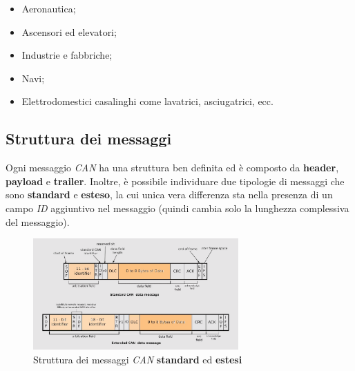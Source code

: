 \begin{itemize}
    \item Aeronautica;
    \item Ascensori ed elevatori;
    \item Industrie e fabbriche;
    \item Navi;
    \item Elettrodomestici casalinghi come lavatrici, asciugatrici, ecc. \cite{can_bus_dewesoft}
\end{itemize}

\subsection{Struttura dei messaggi}
Ogni messaggio \emph{CAN} ha una struttura ben definita ed è composto da \textbf{header}, \textbf{payload} e \textbf{trailer}. Inoltre, è possibile individuare due tipologie di messaggi che sono \textbf{standard} e \textbf{esteso}, la cui unica vera differenza sta nella presenza di un campo \emph{ID} aggiuntivo nel messaggio (quindi cambia solo la lunghezza complessiva del messaggio).

\begin{figure}[h]
    \centering
    \includegraphics[width=0.7\textwidth]{capitoli/figure-protocolli/can-data-message-structure.png}
    \caption{Struttura dei messaggi \emph{CAN} \textbf{standard} ed \textbf{estesi}}
    \label{fig:can-message-structure}
\end{figure}

